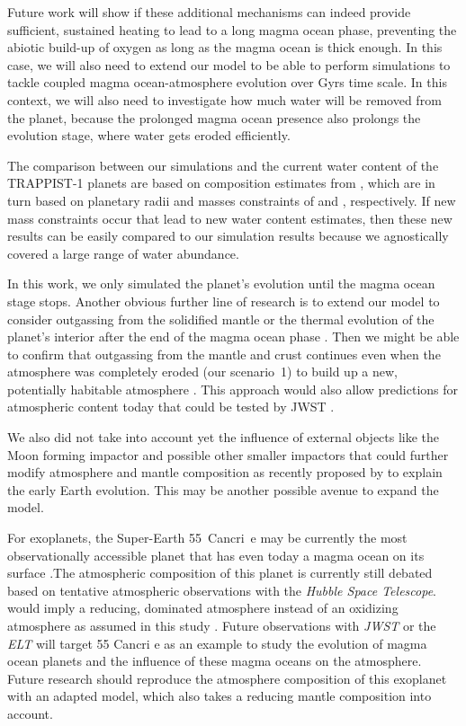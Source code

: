 \documentclass[paper=letterpaper,fontsize=12pt,oneside,twocolumn]{article}
\begin{document}
Future work will show if these additional mechanisms can indeed provide sufficient, sustained heating to lead to a long magma ocean phase, preventing the abiotic build-up of oxygen as long as the magma ocean is thick enough. In this case, we will also need to extend our model to be able to perform simulations to tackle coupled magma ocean-atmosphere evolution over Gyrs time scale. In this context, we will also need to investigate how much water will be removed from the planet, because the prolonged magma ocean presence also prolongs the evolution stage, where water gets eroded efficiently.

The comparison between our simulations and the current water content of the TRAPPIST-1 planets are based on composition estimates from \citet{Dorn2018}, which are in turn based on planetary radii and masses constraints of \citet{Delrez2018} and \citet{Grimm2018}, respectively. If new mass constraints occur that lead to new water content estimates, then these new results can be easily compared to our simulation results because we agnostically covered a large range of water abundance.

In this work, we only simulated the planet's evolution until the magma ocean stage stops. Another obvious further line of research is to extend our model to consider outgassing from the solidified mantle or the thermal evolution of the planet's interior after the end of the magma ocean phase \citep[Garcia et al., in prep.]{Driscoll2013}. Then we might be able to confirm that outgassing from the mantle and crust continues even when the atmosphere was completely eroded (our scenario~1) to build up a new, potentially habitable atmosphere \citep{Godolt2019}. This approach would also allow predictions for atmospheric content today that could be tested by JWST \citep{Wunderlich2019}.

We also did not take into account yet the influence of external objects like the Moon forming impactor and possible other smaller impactors that could further modify atmosphere and mantle composition as recently proposed by \citet{zahnle2019} to explain the early Earth evolution. This may be another possible avenue to expand the model.

For exoplanets, the Super-Earth 55~Cancri~e may be currently the most observationally accessible planet that has even today a magma ocean on its surface \citep{Demory2016}.The atmospheric composition of this planet is currently still debated based on tentative atmospheric  observations with the \textit{Hubble Space Telescope}.  would imply a reducing,  dominated atmosphere instead of an oxidizing atmosphere as assumed in this study \citep{Tsiaras2016,Hammond2017,Zilinskas2020}.
Future observations with \textit{JWST} or the \textit{ELT} will target 55 Cancri e as an example to study the evolution of magma ocean planets and the influence of these magma oceans on the atmosphere. Future research should reproduce the atmosphere composition of this exoplanet with an adapted model, which also takes a reducing mantle composition into account. 
\end{document}
